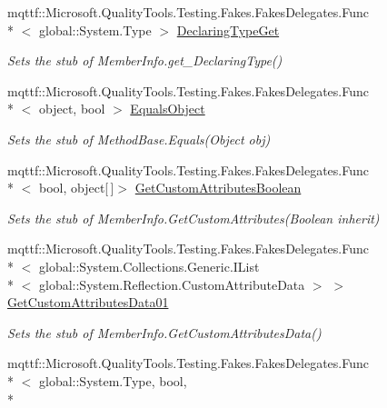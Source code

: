\begin{DoxyCompactItemize}
mqttf\-::\-Microsoft.\-Quality\-Tools.\-Testing.\-Fakes.\-Fakes\-Delegates.\-Func\\*
$<$ global\-::\-System.\-Type $>$ \hyperlink{class_system_1_1_reflection_1_1_fakes_1_1_stub_method_base_a48817cbde98049f88a93732a6ff0a567}{Declaring\-Type\-Get}
\begin{DoxyCompactList}\small\item\em Sets the stub of Member\-Info.\-get\-\_\-\-Declaring\-Type()\end{DoxyCompactList}\item 
mqttf\-::\-Microsoft.\-Quality\-Tools.\-Testing.\-Fakes.\-Fakes\-Delegates.\-Func\\*
$<$ object, bool $>$ \hyperlink{class_system_1_1_reflection_1_1_fakes_1_1_stub_method_base_a84e14ca18193fe6f46b067331e2e2517}{Equals\-Object}
\begin{DoxyCompactList}\small\item\em Sets the stub of Method\-Base.\-Equals(\-Object obj)\end{DoxyCompactList}\item 
mqttf\-::\-Microsoft.\-Quality\-Tools.\-Testing.\-Fakes.\-Fakes\-Delegates.\-Func\\*
$<$ bool, object\mbox{[}$\,$\mbox{]}$>$ \hyperlink{class_system_1_1_reflection_1_1_fakes_1_1_stub_method_base_a47392a9d2d8944b9ec532f8330a71e78}{Get\-Custom\-Attributes\-Boolean}
\begin{DoxyCompactList}\small\item\em Sets the stub of Member\-Info.\-Get\-Custom\-Attributes(\-Boolean inherit)\end{DoxyCompactList}\item 
mqttf\-::\-Microsoft.\-Quality\-Tools.\-Testing.\-Fakes.\-Fakes\-Delegates.\-Func\\*
$<$ global\-::\-System.\-Collections.\-Generic.\-I\-List\\*
$<$ global\-::\-System.\-Reflection.\-Custom\-Attribute\-Data $>$ $>$ \hyperlink{class_system_1_1_reflection_1_1_fakes_1_1_stub_method_base_aff8bd4745418b80e02dd1cfd69134d39}{Get\-Custom\-Attributes\-Data01}
\begin{DoxyCompactList}\small\item\em Sets the stub of Member\-Info.\-Get\-Custom\-Attributes\-Data()\end{DoxyCompactList}\item 
mqttf\-::\-Microsoft.\-Quality\-Tools.\-Testing.\-Fakes.\-Fakes\-Delegates.\-Func\\*
$<$ global\-::\-System.\-Type, bool, \\*

\end{DoxyCompactItemize}
